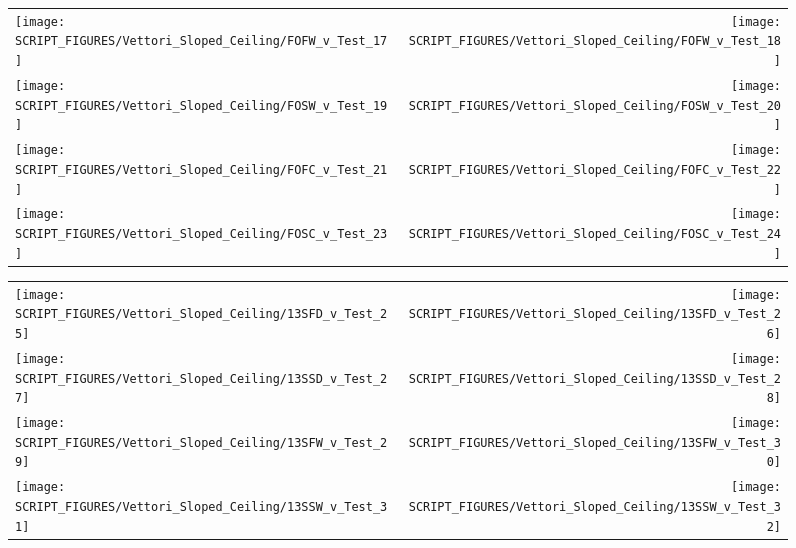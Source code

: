 \begin{figure}[p]
\begin{tabular*}{\textwidth}{l@{\extracolsep{\fill}}r}
\texttt{[image: SCRIPT\_FIGURES/Vettori\_Sloped\_Ceiling/FOFW\_v\_Test\_17]} &
\texttt{[image: SCRIPT\_FIGURES/Vettori\_Sloped\_Ceiling/FOFW\_v\_Test\_18]} \\
\texttt{[image: SCRIPT\_FIGURES/Vettori\_Sloped\_Ceiling/FOSW\_v\_Test\_19]} &
\texttt{[image: SCRIPT\_FIGURES/Vettori\_Sloped\_Ceiling/FOSW\_v\_Test\_20]} \\
\texttt{[image: SCRIPT\_FIGURES/Vettori\_Sloped\_Ceiling/FOFC\_v\_Test\_21]} &
\texttt{[image: SCRIPT\_FIGURES/Vettori\_Sloped\_Ceiling/FOFC\_v\_Test\_22]} \\
\texttt{[image: SCRIPT\_FIGURES/Vettori\_Sloped\_Ceiling/FOSC\_v\_Test\_23]} &
\texttt{[image: SCRIPT\_FIGURES/Vettori\_Sloped\_Ceiling/FOSC\_v\_Test\_24]} \\
\end{tabular*}
\label{Vettori_Sloped_3}
\end{figure}

\begin{figure}[p]
\begin{tabular*}{\textwidth}{l@{\extracolsep{\fill}}r}
\texttt{[image: SCRIPT\_FIGURES/Vettori\_Sloped\_Ceiling/13SFD\_v\_Test\_25]} &
\texttt{[image: SCRIPT\_FIGURES/Vettori\_Sloped\_Ceiling/13SFD\_v\_Test\_26]} \\
\texttt{[image: SCRIPT\_FIGURES/Vettori\_Sloped\_Ceiling/13SSD\_v\_Test\_27]} &
\texttt{[image: SCRIPT\_FIGURES/Vettori\_Sloped\_Ceiling/13SSD\_v\_Test\_28]} \\
\texttt{[image: SCRIPT\_FIGURES/Vettori\_Sloped\_Ceiling/13SFW\_v\_Test\_29]} &
\texttt{[image: SCRIPT\_FIGURES/Vettori\_Sloped\_Ceiling/13SFW\_v\_Test\_30]} \\
\texttt{[image: SCRIPT\_FIGURES/Vettori\_Sloped\_Ceiling/13SSW\_v\_Test\_31]} &
\texttt{[image: SCRIPT\_FIGURES/Vettori\_Sloped\_Ceiling/13SSW\_v\_Test\_32]} \\
\end{tabular*}
\label{Vettori_Sloped_4}
\end{figure}

